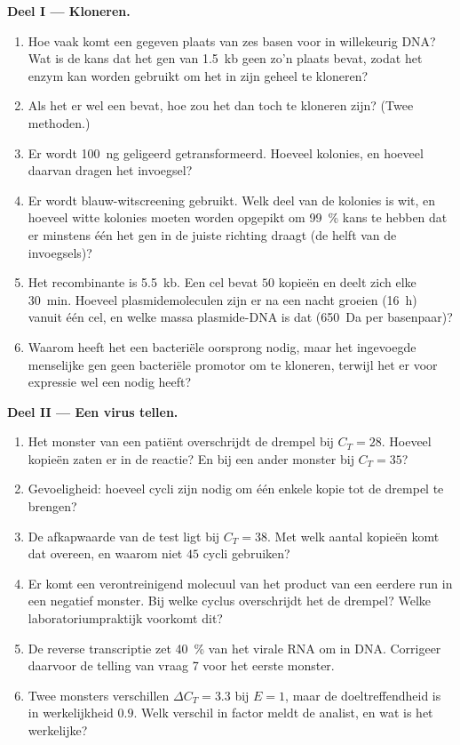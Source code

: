 \begin{problem}
\medskip
\noindent\textbf{Deel I --- Kloneren.}
\begin{enumerate}
  \item Hoe vaak komt een gegeven plaats van zes basen voor in
        willekeurig DNA? Wat is de kans dat het gen van \qty{1.5}{kb}
        geen zo'n plaats bevat, zodat het enzym kan worden gebruikt om
        het in zijn geheel te kloneren?
  \item Als het er wel een bevat, hoe zou het dan toch te kloneren
        zijn? (Twee methoden.)
  \item Er wordt \qty{100}{ng} geligeerd  getransformeerd.
        Hoeveel kolonies, en hoeveel daarvan dragen het invoegsel?
  \item Er wordt blauw-witscreening gebruikt. Welk deel van de kolonies
        is wit, en hoeveel witte kolonies moeten worden opgepikt om
        \qty{99}{\%} kans te hebben dat er minstens één het gen in de
        juiste richting draagt (de helft van de invoegsels)?
  \item Het recombinante  is \qty{5.5}{kb}. Een cel bevat $50$
        kopieën en deelt zich elke \qty{30}{min}. Hoeveel
        plasmidemoleculen zijn er na een nacht groeien (\qty{16}{h})
        vanuit één cel, en welke massa plasmide-DNA is dat
        (\qty{650}{Da} per basenpaar)?
  \item Waarom heeft het  een bacteriële oorsprong nodig, maar
        het ingevoegde menselijke gen geen bacteriële promotor om te
        kloneren, terwijl het er voor expressie wel een nodig heeft?
\end{enumerate}

\medskip
\noindent\textbf{Deel II --- Een virus tellen.}
\begin{enumerate}[resume]
  \item Het monster van een patiënt overschrijdt de drempel bij
        $C_{T} = 28$. Hoeveel kopieën zaten er in de reactie? En bij een
        ander monster bij $C_{T} = 35$?
  \item Gevoeligheid: hoeveel cycli zijn nodig om één enkele kopie tot
        de drempel te brengen?
  \item De afkapwaarde van de test ligt bij $C_{T} = 38$. Met welk
        aantal kopieën komt dat overeen, en waarom niet $45$ cycli
        gebruiken?
  \item Er komt een verontreinigend molecuul van het product van een
        eerdere run in een negatief monster. Bij welke cyclus
        overschrijdt het de drempel? Welke laboratoriumpraktijk
        voorkomt dit?
  \item De reverse transcriptie zet \qty{40}{\%} van het virale RNA om
        in DNA. Corrigeer daarvoor de telling van vraag 7 voor het
        eerste monster.
  \item Twee monsters verschillen $\Delta C_{T} = 3.3$ bij $E = 1$, maar
        de doeltreffendheid is in werkelijkheid $0.9$. Welk verschil in
        factor meldt de analist, en wat is het werkelijke?
\end{enumerate}


\end{problem}
